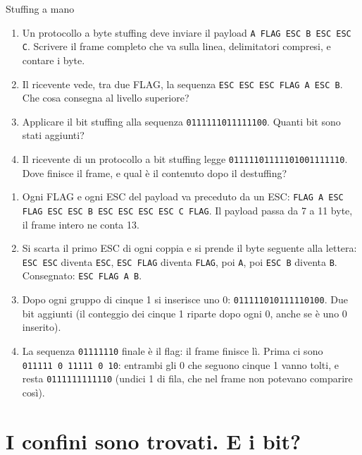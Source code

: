 \begin{esercizio}{Stuffing a mano}
\begin{enumerate}[label=(\alph*)]
    \item Un protocollo a byte stuffing deve inviare il payload \texttt{A FLAG ESC B ESC ESC C}. Scrivere il frame completo che va
          sulla linea, delimitatori compresi, e contare i byte.
    \item Il ricevente vede, tra due FLAG, la sequenza \texttt{ESC ESC ESC FLAG A ESC B}. Che cosa consegna al livello superiore?
    \item Applicare il bit stuffing alla sequenza \texttt{0111111011111100}. Quanti bit sono stati aggiunti?
    \item Il ricevente di un protocollo a bit stuffing legge \texttt{01111101111101001111110}. Dove finisce il frame, e qual è il
          contenuto dopo il destuffing?
\end{enumerate}

\svolgimento
\begin{enumerate}[label=(\alph*)]
    \item Ogni FLAG e ogni ESC del payload va preceduto da un ESC:
          \texttt{FLAG A ESC FLAG ESC ESC B ESC ESC ESC ESC C FLAG}. Il payload passa da 7 a 11 byte, il frame intero ne conta 13.
    \item Si scarta il primo ESC di ogni coppia e si prende il byte seguente alla lettera: \texttt{ESC ESC} diventa \texttt{ESC},
          \texttt{ESC FLAG} diventa \texttt{FLAG}, poi \texttt{A}, poi \texttt{ESC B} diventa \texttt{B}. Consegnato:
          \texttt{ESC FLAG A B}.
    \item Dopo ogni gruppo di cinque 1 si inserisce uno 0: \texttt{011111\textcolor{netred}{0}1011111\textcolor{netred}{0}100}.
          Due bit aggiunti (il conteggio dei cinque 1 riparte dopo ogni 0, anche se è uno 0 inserito).
    \item La sequenza \texttt{01111110} finale è il flag: il frame finisce lì. Prima ci sono \texttt{011111\,0\,11111\,0\,10}:
          entrambi gli 0 che seguono cinque 1 vanno tolti, e resta \texttt{0111111111110} (undici 1 di fila, che nel frame non
          potevano comparire così).
\end{enumerate}
\end{esercizio}

\section{I confini sono trovati. E i bit?}

